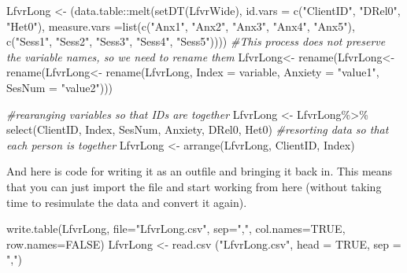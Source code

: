 \documentclass[
  11pt,
]{book}
\newenvironment{Shaded}{\begin{snugshade}}{\end{snugshade}}
\newcommand{\AttributeTok}[1]{\textcolor[rgb]{0.77,0.63,0.00}{#1}}
\newcommand{\CommentTok}[1]{\textcolor[rgb]{0.56,0.35,0.01}{\textit{#1}}}
\newcommand{\ConstantTok}[1]{\textcolor[rgb]{0.00,0.00,0.00}{#1}}
\newcommand{\FunctionTok}[1]{\textcolor[rgb]{0.00,0.00,0.00}{#1}}
\newcommand{\NormalTok}[1]{#1}
\newcommand{\OtherTok}[1]{\textcolor[rgb]{0.56,0.35,0.01}{#1}}
\newcommand{\SpecialCharTok}[1]{\textcolor[rgb]{0.00,0.00,0.00}{#1}}
\newcommand{\StringTok}[1]{\textcolor[rgb]{0.31,0.60,0.02}{#1}}
\begin{document}
\begin{Shaded}
\begin{Highlighting}[]
\NormalTok{LfvrLong }\OtherTok{\textless{}{-}}\NormalTok{ (data.table}\SpecialCharTok{::}\FunctionTok{melt}\NormalTok{(}\FunctionTok{setDT}\NormalTok{(LfvrWide), }\AttributeTok{id.vars =} \FunctionTok{c}\NormalTok{(}\StringTok{"ClientID"}\NormalTok{, }\StringTok{"DRel0"}\NormalTok{, }\StringTok{"Het0"}\NormalTok{), }\AttributeTok{measure.vars =}\FunctionTok{list}\NormalTok{(}\FunctionTok{c}\NormalTok{(}\StringTok{"Anx1"}\NormalTok{, }\StringTok{"Anx2"}\NormalTok{, }\StringTok{"Anx3"}\NormalTok{, }\StringTok{"Anx4"}\NormalTok{, }\StringTok{"Anx5"}\NormalTok{), }\FunctionTok{c}\NormalTok{(}\StringTok{"Sess1"}\NormalTok{, }\StringTok{"Sess2"}\NormalTok{, }\StringTok{"Sess3"}\NormalTok{, }\StringTok{"Sess4"}\NormalTok{, }\StringTok{"Sess5"}\NormalTok{))))}
\CommentTok{\#This process  does not preserve the variable names, so we need to rename them}
\NormalTok{LfvrLong}\OtherTok{\textless{}{-}}  \FunctionTok{rename}\NormalTok{(LfvrLong}\OtherTok{\textless{}{-}}  \FunctionTok{rename}\NormalTok{(LfvrLong}\OtherTok{\textless{}{-}}  \FunctionTok{rename}\NormalTok{(LfvrLong, }\AttributeTok{Index =}\NormalTok{ variable, }\AttributeTok{Anxiety =} \StringTok{"value1"}\NormalTok{, }\AttributeTok{SesNum =} \StringTok{"value2"}\NormalTok{)))}

\CommentTok{\#rearanging variables so that IDs are together}
\NormalTok{LfvrLong }\OtherTok{\textless{}{-}}\NormalTok{ LfvrLong}\SpecialCharTok{\%\textgreater{}\%}
  \FunctionTok{select}\NormalTok{(ClientID, Index, SesNum, Anxiety, DRel0, Het0)}
\CommentTok{\#resorting data so that each person is together}
\NormalTok{LfvrLong }\OtherTok{\textless{}{-}} \FunctionTok{arrange}\NormalTok{(LfvrLong, ClientID, Index)}
\end{Highlighting}
\end{Shaded}

And here is code for writing it as an outfile and bringing it back in. This means that you can just import the file and start working from here (without taking time to resimulate the data and convert it again).

\begin{Shaded}
\begin{Highlighting}[]
\FunctionTok{write.table}\NormalTok{(LfvrLong, }\AttributeTok{file=}\StringTok{"LfvrLong.csv"}\NormalTok{, }\AttributeTok{sep=}\StringTok{","}\NormalTok{, }\AttributeTok{col.names=}\ConstantTok{TRUE}\NormalTok{, }\AttributeTok{row.names=}\ConstantTok{FALSE}\NormalTok{)}
\NormalTok{LfvrLong }\OtherTok{\textless{}{-}} \FunctionTok{read.csv}\NormalTok{ (}\StringTok{"LfvrLong.csv"}\NormalTok{, }\AttributeTok{head =} \ConstantTok{TRUE}\NormalTok{, }\AttributeTok{sep =} \StringTok{","}\NormalTok{)}
\end{Highlighting}
\end{Shaded}
\end{document}

